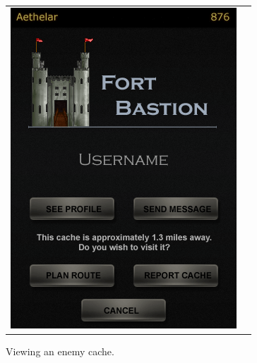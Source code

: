 \begin{figure}[h!]
\begin{tabular}{cc}
	\begin{minipage}{0.3\textwidth}
		\begin{center}
		\begin{minipage}{0.83\textwidth}
		\includegraphics[width=\textwidth]{images/enemy_cache_mockup}
	\caption{Viewing an enemy cache.}
		\end{minipage}
		\end{center}
	\end{minipage}
	\begin{minipage}{0.3\textwidth}
		\begin{center}
		\begin{minipage}{0.83\textwidth}

\end{minipage}
\end{center}
\end{minipage}
\end{tabular}
\end{figure}
